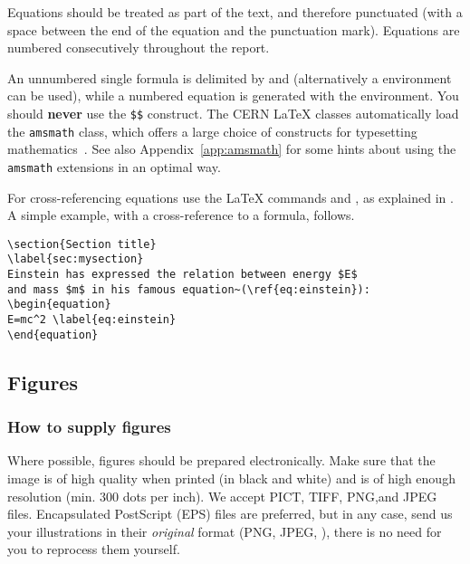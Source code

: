 \documentclass[12pt,twoside,a4paper]{cernrep}
\begin{document}
Equations should be treated as part of the text, and therefore
punctuated (with a space between the end of the equation and the
punctuation mark).  Equations are numbered consecutively throughout
the report. 

An unnumbered single formula is delimited by \Lcs{[} and \Lcs{]}
(alternatively a  environment can be used), while a
numbered equation is generated with the  environment.
You should \textbf{never} use the \texttt{\$\$} construct.  The CERN
\LaTeX{} classes automatically load the \texttt{amsmath} class, which
offers a large choice of constructs for typesetting
mathematics~\cite{bib:voss2005}. See also Appendix~\ref{app:amsmath}
for some hints about using the \texttt{amsmath} extensions in an
optimal way.

For cross-referencing equations use the \LaTeX{} commands 
and , as explained in .
A simple example, with a cross-reference to a formula, follows.

\begin{verbatim}
\section{Section title}
\label{sec:mysection}
Einstein has expressed the relation between energy $E$ 
and mass $m$ in his famous equation~(\ref{eq:einstein}):
\begin{equation}
E=mc^2 \label{eq:einstein}
\end{equation}
\end{verbatim}

\subsection{Figures}
\label{sec:figures}

\subsubsection{How to supply figures}

Where possible, figures should be prepared electronically.  Make sure
that the image is of high quality when printed (in black and white)
and is of high enough resolution (min. 300 dots per inch). We accept
PICT, TIFF, PNG,and JPEG files.  Encapsulated PostScript (EPS) files
are preferred, but in any case, send us your illustrations in their
\emph{original} format (PNG, JPEG, \etc), there is no need for you to
reprocess them yourself.
\end{document}

